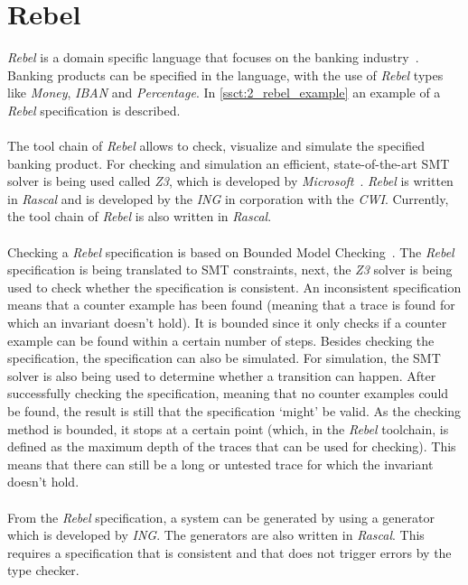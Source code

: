 \section{Rebel}
\textit{Rebel} is a domain specific language that focuses on the banking
industry~\cite{stoel2016solving}. Banking products can be specified in the
language, with the use of \textit{Rebel} types like \textit{Money},
\textit{IBAN} and \textit{Percentage}. In \autoref{ssct:2_rebel_example} an
example of a \textit{Rebel} specification is described.\\
\\
The tool chain of \textit{Rebel} allows to check, visualize and simulate the specified
banking product. For checking and simulation an efficient, state-of-the-art SMT
solver is being used called \textit{Z3}, which is developed by
\textit{Microsoft}~\cite{de2008z3}. \textit{Rebel} is written in \textit{Rascal}
and is developed by the \textit{ING} in corporation with the \textit{CWI}.
Currently, the tool chain of \textit{Rebel} is also written in
\textit{Rascal}.\\
\\
Checking a \textit{Rebel} specification is based on Bounded Model
Checking~\cite{stoel2016solving}. The \textit{Rebel} specification is being
translated to SMT constraints, next, the \textit{Z3} solver is being used to
check whether the specification is consistent. An inconsistent specification
means that a counter example has been found (meaning that a trace is found for which an
invariant doesn't hold). It is bounded since it only checks if a counter example
can be found within a certain number of steps. Besides checking the
specification, the specification can also be simulated. For simulation, the SMT
solver is also being used to determine whether a transition can happen. After
successfully checking the specification, meaning that no counter examples could
be found, the result is still that the specification `might' be valid. As the
checking method is bounded, it stops at a certain point (which, in the
\textit{Rebel} toolchain, is defined as the maximum depth of the traces that can
be used for checking). This means that there can still be a long or untested
trace for which the invariant doesn't hold.\\
\\
From the \textit{Rebel} specification, a system can be generated by using a
generator which is developed by \textit{ING}. The generators are also written in
\textit{Rascal}. This requires a specification that is consistent and that does
not trigger errors by the type checker.

